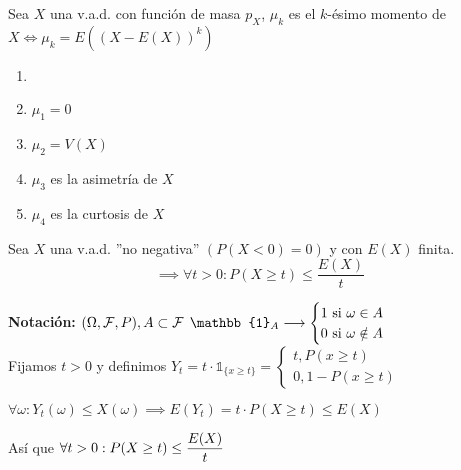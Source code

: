 \begin{defn}[Momentos de $X$]
	Sea $X$ una v.a.d. con función de masa $p_X$, $\mu_k$ es el $k$-ésimo momento de $X \iff \mu_k= E\left((X-E(X))^k\right)$
\end{defn}

\begin{obs}
	\begin{enumerate}
		\item[]
		\item $\mu_1=0$
		\item $\mu_2=V(X)$
		\item $\mu_3$ es la asimetría de $X$
		\item $\mu_4$ es la curtosis de $X$
	\end{enumerate}
\end{obs}


\begin{teo}
	Sea $X$ una v.a.d. ''no negativa'' $(P(X<0)=0)$ y con $E(X)$ finita.
	\[\implies \forall t >0 : P(X\geq t) \leq \frac{E(X)}{t}\]
	\begin{dem}
		\textbf{Notación: } $(\Omega, \mathcal{F}, P), A\subset \mathcal{F}$ $\mathbb{1}_A \longrightarrow \begin{cases}
			1 \tex{ si } \omega \in A \\
			0 \tex{ si } \omega \notin A
		\end{cases}$ \\
		Fijamos $t>0$ y definimos $Y_t=t\cdot \mathbb{1}_{\{x\geq t\}}=\begin{cases}
			t, P(x\geq t) \\
			0, 1-P(x\geq t)
		\end{cases}$
		\begin{obs}
			$\forall \omega : Y_t(\omega)\leq X(\omega) \implies E(Y_t)=t\cdot P(X\geq t)\leq E(X)$
		\end{obs}
		Así que $\displaystyle \forall t >0 : P(X\geq t) \leq \frac{E(X)}{t}$
	\end{dem}
\end{teo}

